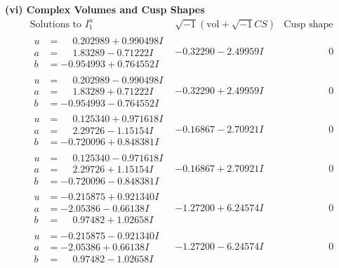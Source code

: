 \documentclass[1p]{elsarticle_modified}
\theoremstyle{definition}
\newcommand{\I}{\sqrt{-1}}
\begin{document}
\newpage\flushleft \textbf{(vi) Complex Volumes and Cusp Shapes}
$$\begin{array}{c|c|c}  
\text{Solutions to }I^u_{1}& \I (\text{vol} + \sqrt{-1}CS) & \text{Cusp shape}\\
 \hline 
\begin{aligned}
u &= \phantom{-}0.202989 + 0.990498 I \\
a &= \phantom{-}1.83289 - 0.71222 I \\
b &= -0.954993 + 0.764552 I\end{aligned}
 & -0.32290 - 2.49959 I & \phantom{-0.000000 } 0 \\ \hline\begin{aligned}
u &= \phantom{-}0.202989 - 0.990498 I \\
a &= \phantom{-}1.83289 + 0.71222 I \\
b &= -0.954993 - 0.764552 I\end{aligned}
 & -0.32290 + 2.49959 I & \phantom{-0.000000 } 0 \\ \hline\begin{aligned}
u &= \phantom{-}0.125340 + 0.971618 I \\
a &= \phantom{-}2.29726 - 1.15154 I \\
b &= -0.720096 + 0.848381 I\end{aligned}
 & -0.16867 - 2.70921 I & \phantom{-0.000000 } 0 \\ \hline\begin{aligned}
u &= \phantom{-}0.125340 - 0.971618 I \\
a &= \phantom{-}2.29726 + 1.15154 I \\
b &= -0.720096 - 0.848381 I\end{aligned}
 & -0.16867 + 2.70921 I & \phantom{-0.000000 } 0 \\ \hline\begin{aligned}
u &= -0.215875 + 0.921340 I \\
a &= -2.05386 - 0.66138 I \\
b &= \phantom{-}0.97482 + 1.02658 I\end{aligned}
 & -1.27200 + 6.24574 I & \phantom{-0.000000 } 0 \\ \hline\begin{aligned}
u &= -0.215875 - 0.921340 I \\
a &= -2.05386 + 0.66138 I \\
b &= \phantom{-}0.97482 - 1.02658 I\end{aligned}
 & -1.27200 - 6.24574 I & \phantom{-0.000000 } 0 \\ \hline\begin{aligned}

\end{aligned}
\end{array}$$
\end{document}
